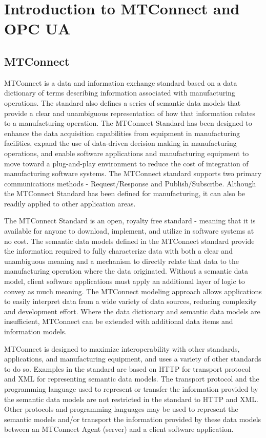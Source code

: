 \section{Introduction to MTConnect and OPC UA}\label{intro}

\subsection{MTConnect}\label{intro-to-mtconnect}
MTConnect is a data and information exchange standard based on a data dictionary of terms describing information associated with manufacturing operations.  The standard also defines a series of semantic data models that provide a clear and unambiguous representation of how that information relates to a manufacturing operation.  The MTConnect Standard has been designed to enhance the data acquisition capabilities from equipment in manufacturing facilities, expand the use of data-driven decision making in manufacturing operations, and enable software applications and manufacturing equipment to move toward a plug-and-play environment to reduce the cost of integration of manufacturing software systems.
The MTConnect standard supports two primary communications methods - Request/Response and Publish/Subscribe.
Although the MTConnect Standard has been defined for manufacturing, it can also be readily applied to other application areas.

The MTConnect Standard is an open, royalty free standard - meaning that it is available for anyone to download, implement, and utilize in software systems at no cost.
The semantic data models defined in the MTConnect standard provide the information required to fully characterize data with both a clear and unambiguous meaning and a mechanism to directly relate that data to the manufacturing operation where the data originated.  Without a semantic data model, client software applications must apply an additional layer of logic to convey as much meaning.  The MTConnect modeling approach allows applications to easily interpret data from a wide variety of data sources, reducing complexity and development effort.
Where the data dictionary and semantic data models are insufficient, MTConnect can be extended with additional data items and information models.

MTConnect is designed to maximize interoperability with other standards, applications, and manufacturing equipment, and uses a variety of other standards to do so. Examples in the standard are based on HTTP for transport protocol and XML for representing semantic data models. The transport protocol and the programming language used to represent or transfer the information provided by the semantic data models are not restricted in the standard to HTTP and XML. Other protocols and programming languages may be used to represent the semantic models and/or transport the information provided by these data models between an MTConnect Agent (server) and a client software application.

